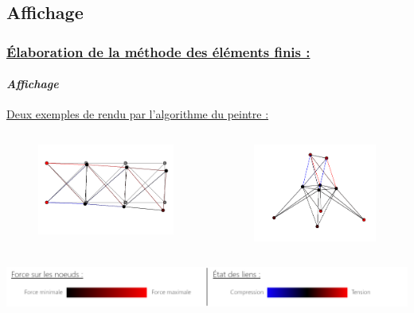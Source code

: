 \documentclass[10pt]{beamer}
\begin{document}
	\subsection{Affichage}
	\begin{frame}
		\frametitle{\uline{\'Elaboration de la m\'ethode des \'el\'ements finis :}}
		\framesubtitle{\textit{Affichage}}
		\uline{Deux exemples de rendu par l'algorithme du peintre :}
		\begin{columns}[t]
			\begin{column}{5cm}
				\begin{figure}
 				 	\includegraphics[scale=0.26]{Images/2D_exemple.png}
 				\end{figure}
  			\end{column}
 			\begin{column}{5cm}
 				\begin{figure}
 				 	\includegraphics[scale=0.26]{Images/3D_exemple.png}
 				\end{figure}
			\end{column}
 		\end{columns}
 		\includegraphics[scale=0.69]{Images/legende.png}
	\end{frame} 
\end{document}
